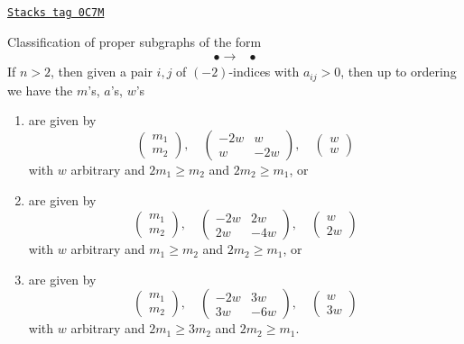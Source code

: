 \begin{lemma}
\label{models-lemma-two-by-two}
\href{https://stacks.math.columbia.edu/tag/0C7M}{\texttt{Stacks tag 0C7M}}

Classification of proper subgraphs of the form
$$
\begin{array}{cc}\bullet \longrightarrow & \bullet\end{array}
$$
If $n > 2$, then given a pair $i, j$ of $(-2)$-indices with $a_{ij} > 0$,
then up to ordering we have the $m$'s, $a$'s, $w$'s
\begin{enumerate}
\item
\label{models-item-A2}
are given by
$$
\left(
\begin{matrix}
m_1 \\
m_2
\end{matrix}
\right),
\quad
\left(
\begin{matrix}
-2w & w \\
w & -2w
\end{matrix}
\right),
\quad
\left(
\begin{matrix}
w \\
w
\end{matrix}
\right)
$$
with $w$ arbitrary and $2m_1 \geq m_2$ and $2m_2 \geq m_1$, or
\item
\label{models-item-B2}
are given by
$$
\left(
\begin{matrix}
m_1 \\
m_2
\end{matrix}
\right),
\quad
\left(
\begin{matrix}
-2w & 2w \\
2w & -4w
\end{matrix}
\right),
\quad
\left(
\begin{matrix}
w \\
2w
\end{matrix}
\right)
$$
with $w$ arbitrary and $m_1 \geq m_2$ and $2m_2 \geq m_1$, or
\item
\label{models-item-G2}
are given by
$$
\left(
\begin{matrix}
m_1 \\
m_2
\end{matrix}
\right),
\quad
\left(
\begin{matrix}
-2w & 3w \\
3w & -6w
\end{matrix}
\right),
\quad
\left(
\begin{matrix}
w \\
3w
\end{matrix}
\right)
$$
with $w$ arbitrary and $2m_1 \geq 3m_2$ and $2m_2 \geq m_1$.
\end{enumerate}
\end{lemma}

